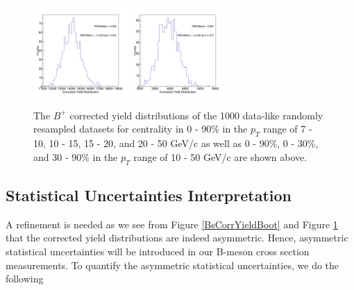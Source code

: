 \begin{figure}[h]
\begin{center}
\includegraphics[width= 0.32\textwidth]{Figures/Chapter4/BPCorrYield_0_30_10-50_Assym.png}
\includegraphics[width= 0.32\textwidth]{Figures/Chapter4/BPCorrYield_30_90_10-50_Assym.png}  
\caption{The $B^+$ corrected yield distributions of the 1000 data-like randomly resampled datasets for centrality in 0 - 90\% in the $p_T$ range of 7 - 10, 10 - 15, 15 - 20, and 20 - 50 GeV/c as well as 0 - 90\%, 0 - 30\%, and 30 - 90\% in the $p_T$ range of 10 - 50 GeV/c are shown above.} 
\label{BPCorrYieldBoot} 
\end{center}
\end{figure}

\clearpage

\subsection{Statistical Uncertainties Interpretation}

A refinement is needed as we see from Figure \ref{BsCorrYieldBoot} and Figure \ref{BPCorrYieldBoot} that the corrected yield distributions are indeed asymmetric. Hence, asymmetric statistical uncertainties will be introduced in our B-meson cross section measurements. To quantify the asymmetric statistical uncertainties, we do the following



